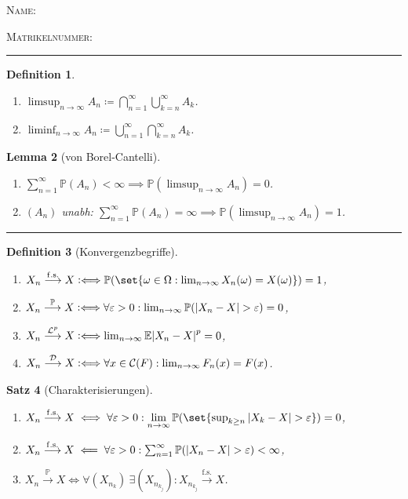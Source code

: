 \documentclass[a4paper,8pt]{article}
\newcounter{Sec}
\theoremstyle{nonumberbreak}
\newtheorem{definition}{Definition}[Sec]
\newtheorem{satz}[definition]{Satz}
\newtheorem{lemma}[definition]{Lemma}
\newcommand{\sep}{%
	\rule{\linewidth}{0.15pt}%
	\stepcounter{Sec}%
	}
\newcommand{\defiff}{\mathrel{\vcentcolon\Longleftrightarrow}}
\newcommand{\defas}{\coloneqq}
\renewcommand{\P}{\mathbb{P}}
\newcommand{\E}{\mathbb{E}}
\newcommand{\sk}{\mathrel{\stackrel{\P}{\longrightarrow}}}
\newcommand{\fsk}{\mathrel{\stackrel{\operatorname{f.s.}}{\longrightarrow}}}
\newcommand{\lpk}{\mathrel{\stackrel{\mathcal{L}^p}{\longrightarrow}}}
\newcommand{\vk}{\mathrel{\stackrel{\mathcal{D}}{\longrightarrow}}}
\begin{document}
\begin{multicols*}{3}
	\textsc{Name:}

	\textsc{Matrikelnummer:}

	\sep
	\begin{definition}
		\begin{enumerate}[label=(\alph*)]
			\item $\limsup_{n\to\infty} A_n\defas \bigcap_{n=1}^\infty\bigcup_{k=n}^\infty A_k$.
			\item $\liminf_{n\to\infty} A_n\defas \bigcup_{n=1}^\infty\bigcap_{k=n}^\infty A_k$.
		\end{enumerate}
	\end{definition}
	\begin{lemma}[von Borel-Cantelli]
		\begin{enumerate}[label=(\alph*)]
			\item $\sum_{n=1}^{\infty}\P(A_n)<\infty\implies \P(\limsup_{n\to\infty}A_n)=0$.
			\item $(A_n)$ unabh: $\sum_{n=1}^{\infty}\P(A_n)=\infty\implies \P(\limsup_{n\to\infty}A_n)=1$.
		\end{enumerate}
	\end{lemma}
	\sep
	\begin{definition}[Konvergenzbegriffe]
		\begin{enumerate}[label=(\alph*)]
			\item $X_n \fsk X \defiff \P(\set{\omega\in\Omega : \lim_{n\to\infty} X_n(\omega) = X(\omega)}) = 1$,
			\item $X_n \sk X \defiff \forall\varepsilon>0:\lim_{n\to\infty}\P(\abs{X_n-X}>\varepsilon)=0$,
			\item $X_n \lpk X \defiff \lim_{n\to\infty} \E\abs{X_n-X}^p = 0$,
			\item $X_n \vk X \defiff \forall x\in\mathcal{C}(F):\lim_{n\to\infty} F_n(x) = F(x)$.
		\end{enumerate}
	\end{definition}
	\begin{satz}[Charakterisierungen]
		\begin{enumerate}[label=(\alph*)]
			\item $X_n \fsk X \iff \forall\varepsilon>0:\lim\limits_{n\to\infty}\P(\set{\sup_{k\geq n}\abs{X_k-X}>\varepsilon}) = 0$,
			\item $X_n \fsk X \impliedby\forall \varepsilon>0:\sum_{n=1}^\infty\P(\abs{X_n-X}>\varepsilon)<\infty$,\\
			\item $X_n \sk X \iff \forall (X_{n_k})~\exists (X_{n_{k_j}}): X_{n_{k_j}}\fsk X$.

\end{enumerate}
\end{satz}
\end{multicols*}
\end{document}
